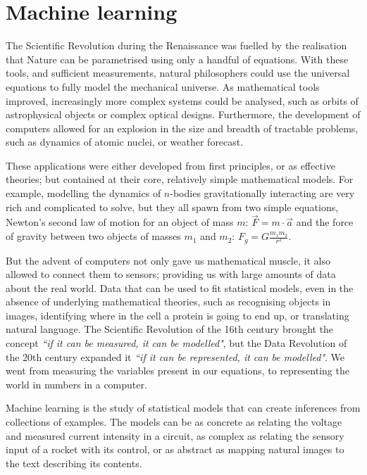\chapter{Machine learning}

The Scientific Revolution during the Renaissance 
was fuelled by the realisation that Nature can be parametrised using only a handful of equations.
With these tools, and sufficient measurements, natural philosophers could use the universal equations to fully model the mechanical universe.
As mathematical tools improved, increasingly more complex systems could be analysed, such as orbits of astrophysical objects or complex optical designs.
Furthermore, the development of computers allowed for an explosion in the size and breadth of tractable problems, such as dynamics of atomic nuclei, or weather forecast.

These applications were either developed from first principles, or as effective theories; but contained at their core, relatively simple mathematical models.
For example, modelling the dynamics of $n$-bodies gravitationally interacting are very rich and complicated to solve, but they all spawn from two simple equations, Newton's second law of motion for an object of mass $m$: $\vec{F} = m \cdot \vec{a}$ and the force of gravity between two objects of masses $m_1$ and $m_2$: $F_g=G\frac{m_1  m_2}{r^2}$.

But the advent of computers not only gave us mathematical muscle, it also allowed to connect them to sensors;
providing us with large amounts of data about the real world.
Data that can be used to fit statistical models, even in the absence of underlying mathematical theories, such as recognising objects in images, identifying where in the cell a protein is going to end up, or translating natural language.
The Scientific Revolution of the 16th century brought the concept \emph{``if it can be measured, it can be modelled"}, but the Data Revolution of the 20th century expanded it \emph{``if it can be \emph{represented}, it can be modelled"}.
We went from measuring the variables present in our equations, to representing the world in numbers in a computer.


Machine learning 
is the study of statistical models that can create inferences from collections of examples. 
The models can be as concrete as relating the voltage and measured current intensity in a circuit, as complex as relating the sensory input of a rocket with its control, or as abstract as mapping natural images to the text describing its contents.

